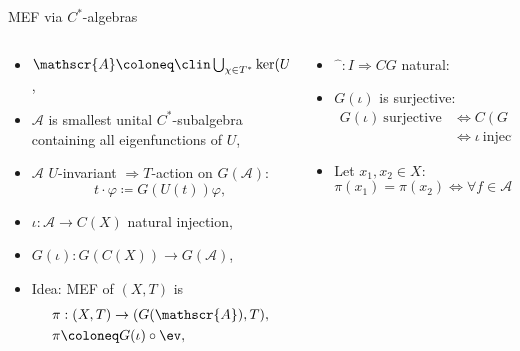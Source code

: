 \begin{frame}[fragile]{MEF via $C^*$-algebras}
  \begin{columns}[t]
    \begin{column}{0.5\textwidth}
     \begin{itemize}
       \item $\mathscr{A}\coloneq \clin \bigcup_{\chi \in T^*} \ker (U- \chi) \subset C(X)$,
    \item  $\mathscr{A}$ is smallest unital $C^*$-subalgebra containing all eigenfunctions of $U$,
   \item \pause
      $\mathscr{A}$ $U$-invariant $\Rightarrow T$-action on $G(\mathscr{A})$:
      \begin{equation*}
      t\cdot \varphi \coloneq G(U(t))\varphi,
      \end{equation*}
    \item \pause $\iota : \mathscr{A} \to C(X)$ natural injection,
    \item $G(\iota)  : G(C(X)) \to G(\mathscr{A})$,
    \item Idea: MEF of $(X,T)$ is
      \begin{equation*}
        \begin{split}
          &\pi : (X,T) \to (G(\mathscr{A}),T),\\ 
          &\pi \coloneq G(\iota) \circ \ev,
        \end{split}
      \end{equation*}
        \end{itemize}
    \end{column}
    \begin{column}{0.5 \textwidth}
 \begin{itemize}
 \item \pause $\widehat{\phantom{a}}: I \Rightarrow CG$ natural:
   \item \pause $G(\iota)$ is surjective:
       \begin{equation*}
        \begin{split}
          G(\iota) \ \text{surjective} &\Leftrightarrow C (G( \iota )) \ \text{injective} \\
          &\Leftrightarrow \iota \ \text{injective},
        \end{split}
              \end{equation*}
    \item \pause Let $x_1, x_2 \in X$: \begin{equation*}
        \pi (x_1) = \pi (x_2) \Leftrightarrow \forall f \in \mathscr{A} : f(x_1) = f(x_2) .
    \end{equation*}
        \end{itemize}
    \end{column}
  \end{columns}
  \end{frame}
